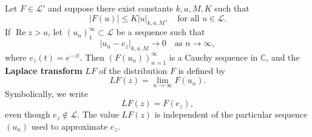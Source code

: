 Let $F \in \mathcal{L}'$ and suppose there exist constants $k, a, M, K$ such that
$$|F(u)| \leq K |u|_{k,a,M}, \quad \text{for all } u \in \mathcal{L}.$$
If $\operatorname{Re} z > a$, let $(u_n)_{1}^{\infty} \subset \mathcal{L}$ be a sequence such that
$$|u_n - e_z|_{k,a,M} \to 0 \quad \text{as } n \to \infty,$$
where $e_z(t) = e^{-zt}$. Then $(F(u_n))_{n=1}^{\infty}$ is a Cauchy sequence in $\mathbb{C}$, and the \textbf{Laplace transform} $LF$ of the distribution $F$ is defined by
$$LF(z) = \lim_{n \to \infty} F(u_n).$$
Symbolically, we write
$$LF(z) = F(e_z),$$
even though $e_z \notin \mathcal{L}$. The value $LF(z)$ is independent of the particular sequence $(u_n)$ used to approximate $e_z$.

